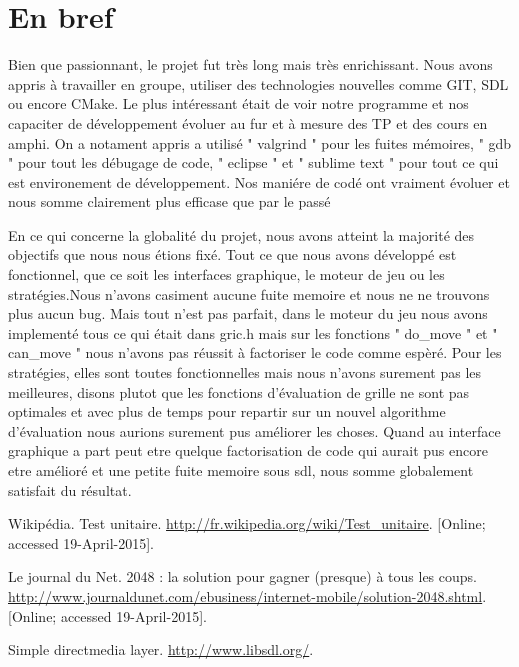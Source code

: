 \documentclass[12pt]{article}
\begin{document}
\section{En bref}
Bien que passionnant, le projet fut très long mais très enrichissant. Nous
avons appris à travailler en groupe, utiliser des technologies nouvelles comme
GIT, SDL ou encore CMake. Le plus intéressant était de voir notre programme et nos capaciter
de développement évoluer au fur et à mesure des TP et des cours en amphi.
On a notament appris a utilisé " valgrind " pour les fuites mémoires, " gdb " pour tout
les débugage de code, " eclipse " et " sublime text " pour
tout ce qui est environement de développement. Nos maniére de codé ont vraiment
évoluer et nous somme clairement plus efficase que par le passé
\par En ce qui concerne la globalité du projet, nous avons atteint la
majorité des objectifs que nous nous étions fixé. Tout ce que nous avons
développé est fonctionnel, que ce soit les interfaces graphique, le moteur
de jeu ou les stratégies.Nous n'avons casiment aucune fuite memoire et nous ne
ne trouvons plus aucun bug. 
\ar Mais tout n'est pas parfait, dans le moteur du jeu
nous avons implementé tous ce qui était dans gric.h mais sur les fonctions
" do\_move " et " can\_move " nous n'avons pas réussit à
factoriser le code comme espèré. Pour les stratégies, elles sont toutes
fonctionnelles mais nous n'avons surement pas les meilleures, disons plutot que les fonctions
d'évaluation de grille ne sont pas optimales et avec plus de temps pour repartir sur un nouvel
algorithme d'évaluation nous aurions surement pus améliorer les choses.
Quand au interface graphique a part peut etre quelque factorisation de code qui aurait
pus encore etre amélioré et une petite fuite memoire sous sdl, nous somme globalement satisfait
du résultat.

\newpage

\begin{thebibliography}{1}
   Wikipédia. Test unitaire.
  \url{http://fr.wikipedia.org/wiki/Test_unitaire}. [Online; accessed
  19-April-2015].

   Le journal du Net. 2048 : la solution pour gagner (presque) à
  tous les coups.
  \url{http://www.journaldunet.com/ebusiness/internet-mobile/solution-2048.shtml}. [Online; accessed 19-April-2015].

   Simple directmedia layer. \url{http://www.libsdl.org/}.
\end{thebibliography}
\end{document}
